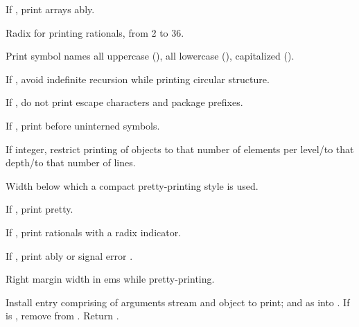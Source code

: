 \begin{LIST}{1cm}
  {
  If \T, print arrays ably.
  }

  {
  Radix for printing rationals, from 2 to 36.
  }

  {
  Print symbol names all uppercase (), all lowercase
  (), capitalized ().
  }

  {
  If \T, avoid indefinite recursion while printing circular
  structure. 
  }

  {
  If \NIL, do not print escape characters and package prefixes.
  }

  {
  If \T, print \kwd{\#:} before uninterned symbols.
  }

  {
  If integer, restrict printing of objects to that number of elements per
  level/to that depth/to that number of lines.
  }

  {
  Width below which a compact pretty-printing style is used.
  }

  {
  If \T, print pretty.
  }

  {
  If \T, print rationals with a radix indicator.
  }

  {
  If \T, print ably or signal error
  . 
  }

  {
  Right margin width in ems while pretty-printing.
  }

  {
  Install entry comprising  of arguments stream and
  object to print; and  as
   into . If 
  is \NIL, remove  from . Return \retval{\NIL}. 
  }


\end{LIST}
